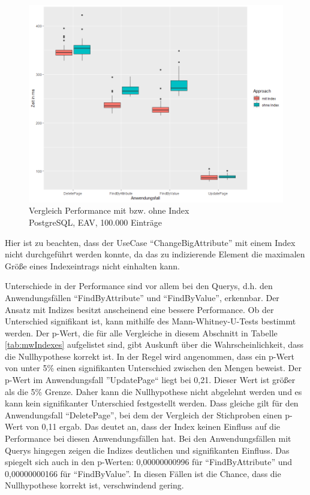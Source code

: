 \begin{figure}[H]
\centering
\includegraphics[scale=0.5]{rStudioPictures/postgreseav100kindexfixed900700.png}
\caption{Vergleich Performance mit bzw. ohne Index \\ PostgreSQL, EAV, 100.000 Einträge}
\label{fig:eav100kIndex}
\end{figure}


Hier ist zu beachten, dass der UseCase ``ChangeBigAttribute'' mit einem Index nicht durchgeführt werden konnte, da das zu indizierende Element die maximalen Größe eines Indexeintrags nicht einhalten kann.

Unterschiede in der Performance sind vor allem bei den Querys, d.h. den Anwendungsfällen ``FindByAttribute'' und ``FindByValue'', erkennbar. Der Ansatz mit Indizes besitzt anscheinend eine bessere Performance. Ob der Unterschied signifikant ist, kann mithilfe des Mann-Whitney-U-Tests bestimmt werden. Der p-Wert, die für alle Vergleiche in diesem Abschnitt in Tabelle \ref{tab:mwIndexes} aufgelistet sind, gibt Auskunft über die Wahrscheinlichkeit, dass die Nullhypothese korrekt ist. In der Regel wird angenommen, dass ein p-Wert von unter 5\% einen signifikanten Unterschied zwischen den Mengen beweist.
Der p-Wert im Anwendungsfall ''UpdatePage`` liegt bei 0,21. Dieser Wert ist größer als die 5\% Grenze. Daher kann die Nullhypothese nicht abgelehnt werden und es kann kein signifikanter Unterschied festgestellt werden. Dass gleiche gilt für den Anwendungsfall ``DeletePage'', bei dem der Vergleich der Stichproben einen p-Wert von 0,11 ergab. Das deutet an, dass der Index keinen Einfluss auf die Performance bei diesen Anwendungsfällen hat.
Bei den Anwendungsfällen mit Querys hingegen zeigen die Indizes deutlichen und signifikanten Einfluss. Das spiegelt sich auch in den p-Werten: 0,00000000996 für ``FindByAttribute'' und 0,00000000166 für ``FindByValue''. In diesen Fällen ist die Chance, dass die Nullhypothese korrekt ist, verschwindend gering.

